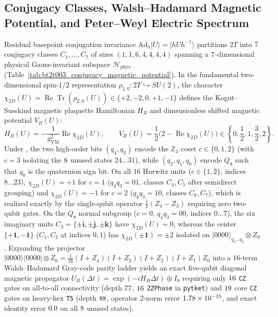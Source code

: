 \documentclass[aps,prx,twocolumn,superscriptaddress,nofootinbib]{revtex4-2}
\begin{document}


\subsection{Conjugacy Classes, Walsh--Hadamard Magnetic Potential, and Peter--Weyl Electric Spectrum}

Residual basepoint conjugation invariance $\mathrm{Ad}_h|U\rangle = |h U h^{-1}\rangle$ partitions $2T$ into $7$ conjugacy classes $C_1,\dots,C_7$ of sizes $(1, 1, 6, 4, 4, 4, 4)$ spanning a $7$-dimensional physical Gauss-invariant subspace $\mathcal{H}_{\mathrm{phys}}$ (Table~\ref{tab:bt2t003_conjugacy_magnetic_potential}). In the fundamental two-dimensional spin-$1/2$ representation $\rho_{2,0} : 2T \hookrightarrow SU(2)$, the character $\chi_{2D}(U) = \operatorname{Re}\operatorname{Tr}(\rho_{2,0}(U)) \in \{+2, -2, 0, +1, -1\}$ defines the Kogut--Susskind magnetic plaquette Hamiltonian $H_B$ and dimensionless shifted magnetic potential $V_B(U)$:
\begin{equation}
\label{eq:magnetic_potential}
H_B(U) = -\frac{1}{g_{\mathrm{YM}}^2}\operatorname{Re}\chi_{2D}(U), \qquad V_B(U) = \frac{1}{2}\bigl(2 - \operatorname{Re}\chi_{2D}(U)\bigr) \in \left\{0, \frac{1}{2}, 1, \frac{3}{2}, 2\right\}.
\end{equation}
Under \BTPlaqEncVer, the two high-order bits $(q_4, q_3)$ encode the $\mathbb{Z}_3$ coset $c \in \{0, 1, 2\}$ (with $c = 3$ isolating the $8$ unused states $24\dots 31$), while $(q_2, q_1, q_0)$ encode $Q_8$ such that $q_0$ is the quaternion sign bit. On all $16$ Hurwitz units ($c \in \{1, 2\}$, indices $8\dots 23$), $\chi_{2D}(U) = +1$ for $c = 1$ ($q_4 q_3 = 01$, classes $C_4, C_5$ after semidirect grouping) and $\chi_{2D}(U) = -1$ for $c = 2$ ($q_4 q_3 = 10$, classes $C_6, C_7$), which is realized exactly by the single-qubit operator $\tfrac{1}{2}(Z_4 - Z_3)$ requiring zero two-qubit gates. On the $Q_8$ normal subgroup ($c = 0$, $q_4 q_3 = 00$, indices $0\dots 7$), the six imaginary units $C_3 = \{\pm\mathbf{i},\pm\mathbf{j},\pm\mathbf{k}\}$ have $\chi_{2D}(U) = 0$, whereas the center $\{+\mathbf{1},-\mathbf{1}\}$ ($C_1, C_2$ at indices $0, 1$) has $\chi_{2D}(\pm\mathbf{1}) = \pm 2$ isolated on $|0000\rangle_{q_4\dots q_1}\otimes Z_0$. Expanding the projector $|0000\rangle\langle 0000|\otimes Z_0 = \tfrac{1}{16}(I+Z_4)(I+Z_3)(I+Z_2)(I+Z_1)Z_0$ into a $16$-term Walsh--Hadamard Gray-code parity ladder yields an exact five-qubit diagonal magnetic propagator $U_B(\Delta t) = \exp(-i H_B \Delta t) \oplus I_8$ requiring only $16$ \texttt{CZ} gates on all-to-all connectivity (depth $77$, $16$ \texttt{ZZPhase} in \texttt{pytket}) and $19$ core \texttt{CZ} gates on heavy-hex \texttt{T5} (depth $88$, operator $2$-norm error $1.78 \times 10^{-15}$, and exact identity error $0.0$ on all $8$ unused states).
\end{document}
